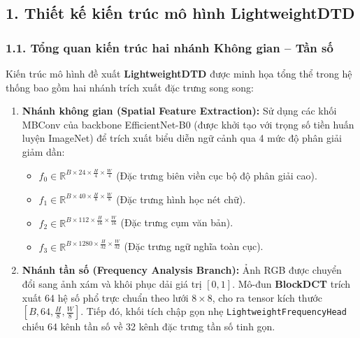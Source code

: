\subsection{1. Thiết kế kiến trúc mô hình LightweightDTD}

\subsubsection{1.1. Tổng quan kiến trúc hai nhánh Không gian -- Tần số}
\indent\indent Kiến trúc mô hình đề xuất \textbf{LightweightDTD} được minh họa tổng thể trong hệ thống bao gồm hai nhánh trích xuất đặc trưng song song:
\begin{enumerate}
    \item \textbf{Nhánh không gian (Spatial Feature Extraction):} Sử dụng các khối MBConv của backbone EfficientNet-B0 (được khởi tạo với trọng số tiền huấn luyện ImageNet) để trích xuất biểu diễn ngữ cảnh qua 4 mức độ phân giải giảm dần:
    \begin{itemize}[label={--}, itemsep=1pt]
        \item $f_0 \in \mathbb{R}^{B \times 24 \times \frac{H}{4} \times \frac{W}{4}}$ (Đặc trưng biên viền cục bộ độ phân giải cao).
        \item $f_1 \in \mathbb{R}^{B \times 40 \times \frac{H}{8} \times \frac{W}{8}}$ (Đặc trưng hình học nét chữ).
        \item $f_2 \in \mathbb{R}^{B \times 112 \times \frac{H}{16} \times \frac{W}{16}}$ (Đặc trưng cụm văn bản).
        \item $f_3 \in \mathbb{R}^{B \times 1280 \times \frac{H}{32} \times \frac{W}{32}}$ (Đặc trưng ngữ nghĩa toàn cục).
    \end{itemize}
    \item \textbf{Nhánh tần số (Frequency Analysis Branch):} Ảnh RGB được chuyển đổi sang ảnh xám và khôi phục dải giá trị $[0, 1]$. Mô-đun \textbf{BlockDCT} trích xuất 64 hệ số phổ trực chuẩn theo lưới $8 \times 8$, cho ra tensor kích thước $[B, 64, \frac{H}{8}, \frac{W}{8}]$. Tiếp đó, khối tích chập gọn nhẹ \texttt{LightweightFrequencyHead} chiếu 64 kênh tần số về 32 kênh đặc trưng tần số tinh gọn.
\end{enumerate}

